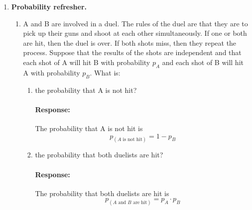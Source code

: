 \documentclass [11pt] {article}
\newcommand{\A}{\bf{A}}
\newenvironment{response}{\vspace{-10pt}\paragraph{Response:}}{}
\renewcommand{\bf}[1]{\textbf{{#1}}}
\begin{document}
\begin{enumerate}
\begin{enumerate}
\begin{enumerate}[itemsep=10pt]
                    \item A non-zero sum of two eigenvectors of a matrix $\A$ corresponding to the
                        same eigenvalue $\lambda$ is always an eigenvector.
                        \begin{response}
                            True. Consider two eigenvectors $\bf{x}, \bf{y}$ of a matrix
                            $\A$ and suppose $\bf{x}, \bf{y}$ correspond to the same eigenvalue $\lambda$. 
                            Then
                            \[\A(\bf{x} + \bf{y}) = \A \bf{x} + \A \bf{y} = \lambda \bf{x} + \lambda \bf{y} = \lambda(\bf{x} + \bf{y})\]
                        \end{response}
                \end{enumerate}
        \end{enumerate}
    \item \bf{Probability refresher.}
        \begin{enumerate}
            \item A and B are involved in a duel. The rules of the duel are that they are to
                pick up their guns and shoot at each other simultaneously. If one or both are hit, 
                then the duel is over. If both shots miss, then they repeat the process. Suppose 
                that the results of the shots are independent and that each shot of A will hit B 
                with probability $p_A$ and each shot of B will hit A with probability $p_B$. What
                is:
                \begin{enumerate}[itemsep=10pt]
                    \item the probability that A is not hit?
                        \begin{response}
                            The probability that A is not hit is 
                            \vspace{-5pt}
                            \[p_{(A \text{ is not hit})} = 1 - p_B\]
                        \end{response}

                    \item the probability that both duelists are hit?
                        \begin{response}
                            The probability that both duelists are hit is 
                            \vspace{-5pt}
                            \[p_{(A \text{ and } B \text{ are hit})} = p_A \cdot p_B\]
                        \end{response}


\end{enumerate}
\end{enumerate}
\end{enumerate}
\end{document}
